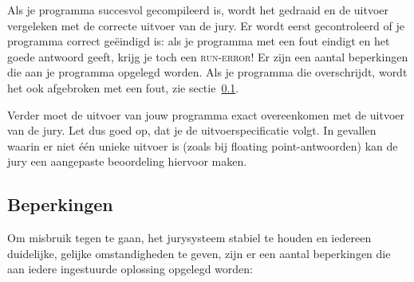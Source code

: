 Als je programma succesvol gecompileerd is, wordt het gedraaid en de
uitvoer vergeleken met de correcte uitvoer van de jury. Er wordt eerst
gecontroleerd of je programma correct ge\"eindigd is: als je programma
met een fout eindigt en het goede antwoord geeft, krijg je toch een
\textsc{run-error}! Er zijn een aantal beperkingen die aan je programma
opgelegd worden. Als je programma die overschrijdt, wordt het ook
afgebroken met een fout, zie sectie~\ref{runlimits}.

Verder moet de uitvoer van jouw programma exact overeenkomen met de
uitvoer van de jury. Let dus goed op, dat je de uitvoerspecificatie
volgt. In gevallen waarin er niet \'e\'en unieke uitvoer is (zoals bij
floating point-antwoorden) kan de jury een aangepaste beoordeling
hiervoor maken.

\subsection{Beperkingen}\label{runlimits}

Om misbruik tegen te gaan, het jurysysteem stabiel te houden en iedereen
duidelijke, gelijke omstandigheden te geven, zijn er een aantal
beperkingen die aan iedere ingestuurde oplossing opgelegd worden:

